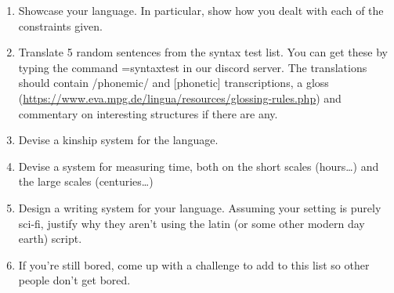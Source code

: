 \begin{enumerate}
    \item Showcase your language. In particular, show how you dealt with each of the constraints given.
    \item Translate 5 random sentences from the syntax test list. You can get these by typing the command =syntaxtest in our discord server. The translations should contain /phonemic/ and [phonetic] transcriptions, a gloss (\url{https://www.eva.mpg.de/lingua/resources/glossing-rules.php}) and commentary on interesting structures if there are any. 
    \item Devise a kinship system for the language.
    \item Devise a system for measuring time, both on the short scales (hours…) and the large scales (centuries…) 
    \item Design a writing system for your language. Assuming your setting is purely sci-fi, justify why they aren't using the latin (or some other modern day earth) script. 
    \item If you're still bored, come up with a challenge to add to this list so other people don't get bored.
\end{enumerate}
